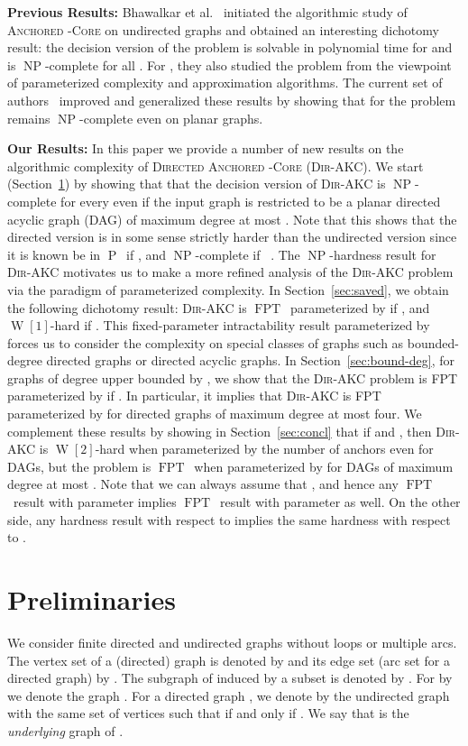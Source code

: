 \documentclass[11pt,a4paper]{article}
\DeclareMathOperator{\operatorClassP}{P}
\newcommand{\classP}{\ensuremath{\operatorClassP}}
\DeclareMathOperator{\operatorClassNP}{NP}
\newcommand{\classNP}{\ensuremath{\operatorClassNP}}
\DeclareMathOperator{\operatorClassFPT}{FPT}
\newcommand{\classFPT}{\ensuremath{\operatorClassFPT}}
\DeclareMathOperator{\operatorClassW}{W}
\newcommand{\classW}[1]{\ensuremath{\operatorClassW[#1]}}
\newcommand{\DAKC}{\textsc{Dir-AKC}\xspace}
\begin{document}
\medskip
\noindent\textbf{Previous Results:} Bhawalkar et al.~\cite{BhawalkarKLRS12} initiated the algorithmic  study of
\textsc{Anchored -Core}  on undirected graphs and obtained an interesting dichotomy result:  the decision version of the
problem is solvable in polynomial time for  and is  \classNP-complete for all . For , they also
studied the problem from the viewpoint of parameterized complexity and approximation algorithms.
The current set of authors~\cite{ChitnisFG13} improved and generalized these results by showing that for  the problem
remains \classNP-complete even on planar graphs.


\medskip\noindent\textbf{Our Results:} In this paper we provide a number of new results on the algorithmic complexity of
\textsc{Directed Anchored -Core}  (\DAKC).
We start (Section~\ref{sec:defs}) by showing that that the decision version of \DAKC{} is \classNP-complete for every   even if the input graph is restricted to be a planar directed acyclic graph (DAG) of maximum degree at most . Note
that this shows that the directed version is in some sense strictly harder than the undirected version since it is known be in
\classP\ if , and \classNP-complete if ~\cite{BhawalkarKLRS12}. The \classNP-hardness result for \DAKC
motivates us to make a more refined analysis of the \DAKC problem via the paradigm of parameterized complexity. In
Section~\ref{sec:saved}, we  obtain the following dichotomy result: \DAKC is \classFPT \, parameterized by  if , and
\classW1-hard if . This fixed-parameter intractability result parameterized by  forces us to consider the
complexity on special classes of graphs such as bounded-degree directed graphs or directed acyclic graphs. In
Section~\ref{sec:bound-deg}, for graphs of degree upper bounded by , we show that the \DAKC problem is FPT
parameterized by  if . In particular, it implies that \DAKC is FPT parameterized by  for
directed graphs of maximum degree at most four. We complement these results by showing in Section~\ref{sec:concl} that  if  and , then \DAKC is \classW2-hard when parameterized by the number of anchors  even for
DAGs, but the problem is \classFPT\ when parameterized by  for DAGs of maximum degree at most . Note that we
can always assume that , and hence any \classFPT\ result with parameter  implies \classFPT\ result with parameter
 as well. On the other side, any hardness result with respect to  implies the same hardness with respect to .

\section{Preliminaries}\label{sec:defs}
We consider finite directed and undirected graphs without loops or multiple arcs. The vertex set of a (directed) graph  is
denoted by  and its edge set (arc set for a directed graph) by . The subgraph of  induced by a subset
 is denoted by . For  by  we denote the graph . For a directed
graph , we denote by  the undirected graph with the same set of vertices such that  if and only if
. We say that  is the \emph{underlying} graph of .
\end{document}
